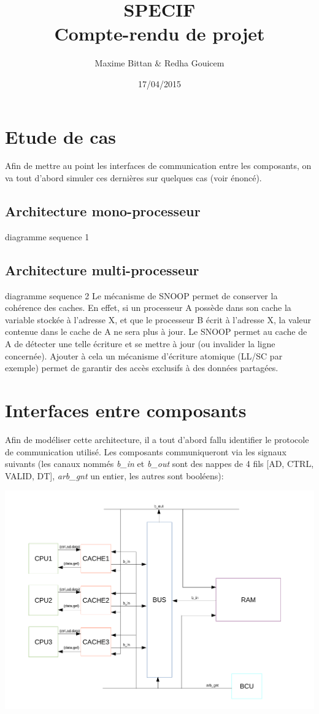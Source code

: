 \documentclass[a4paper, 11pt]{article}
\begin{document}
 
\title{SPECIF\\Compte-rendu de projet}
\author{Maxime Bittan \& Redha Gouicem}
\date{17/04/2015}
 
\maketitle

\section{Etude de cas}
Afin de mettre au point les interfaces de communication entre les
composants, on va tout d'abord simuler ces dernières sur quelques cas
(voir énoncé).
\subsection{Architecture mono-processeur}
diagramme sequence 1

\subsection{Architecture multi-processeur}
diagramme sequence 2
Le mécanisme de SNOOP permet de conserver la cohérence des caches. En effet,
si un processeur A possède dans son cache la variable stockée à l'adresse X,
et que le processeur B écrit à l'adresse X, la valeur contenue dans le cache
de A ne sera plus à jour. Le SNOOP permet au cache de A de détecter une telle
écriture et se mettre à jour (ou invalider la ligne concernée). Ajouter à
cela un mécanisme d'écriture atomique (LL/SC par exemple) permet de garantir
des accès exclusifs à des données partagées.

\section{Interfaces entre composants}
Afin de modéliser cette architecture, il a tout d'abord fallu identifier le 
protocole de communication utilisé. Les composants communiqueront via les
signaux suivants (les canaux nommés \textit{b\_in} et \textit{b\_out} sont
des nappes de 4 fils [AD, CTRL, VALID, DT], \textit{arb\_gnt} un entier,
les autres sont booléens):
\begin{center}
\includegraphics[scale=0.5]{images/archi.pdf}
\end{center}
\end{document}
